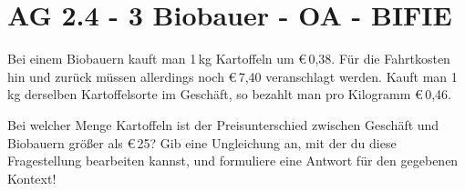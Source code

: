 \section{AG 2.4 - 3 Biobauer - OA - BIFIE}

\begin{beispiel}[AG 2.4]{1} %
	Bei einem Biobauern kauft man 1\,kg Kartoffeln um \euro\,0,38. Für die Fahrtkosten hin und zurück müssen allerdings noch \euro\,7,40 veranschlagt werden. Kauft man 1\,kg derselben Kartoffelsorte
im Geschäft, so bezahlt man pro Kilogramm \euro\,0,46. 

\leer

Bei welcher Menge Kartoffeln ist der Preisunterschied zwischen Geschäft und Biobauern größer als \euro\,25? Gib eine Ungleichung an, mit der du diese Fragestellung bearbeiten kannst,
und formuliere eine Antwort für den gegebenen Kontext! 

\end{beispiel}